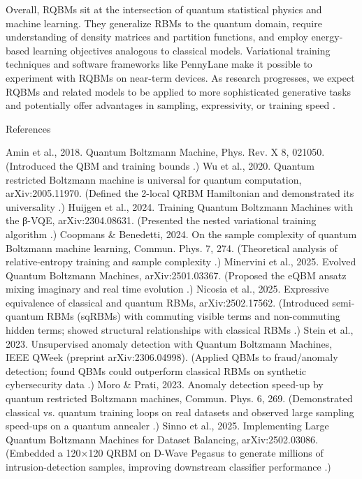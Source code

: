 Overall, RQBMs sit at the intersection of quantum statistical physics and machine learning. They generalize RBMs to the quantum domain, require understanding of density matrices and partition functions, and employ energy-based learning objectives analogous to classical models. Variational training techniques and software frameworks like PennyLane make it possible to experiment with RQBMs on near-term devices. As research progresses, we expect RQBMs and related models to be applied to more sophisticated generative tasks and potentially offer advantages in sampling, expressivity, or training speed .





References





Amin et al., 2018. Quantum Boltzmann Machine, Phys. Rev. X 8, 021050. (Introduced the QBM and training bounds .)
Wu et al., 2020. Quantum restricted Boltzmann machine is universal for quantum computation, arXiv:2005.11970. (Defined the 2-local QRBM Hamiltonian and demonstrated its universality .)
Huijgen et al., 2024. Training Quantum Boltzmann Machines with the β-VQE, arXiv:2304.08631. (Presented the nested variational training algorithm .)
Coopmans & Benedetti, 2024. On the sample complexity of quantum Boltzmann machine learning, Commun. Phys. 7, 274. (Theoretical analysis of relative-entropy training and sample complexity .)
Minervini et al., 2025. Evolved Quantum Boltzmann Machines, arXiv:2501.03367. (Proposed the eQBM ansatz mixing imaginary and real time evolution .)
Nicosia et al., 2025. Expressive equivalence of classical and quantum RBMs, arXiv:2502.17562. (Introduced semi-quantum RBMs (sqRBMs) with commuting visible terms and non-commuting hidden terms; showed structural relationships with classical RBMs .)
Stein et al., 2023. Unsupervised anomaly detection with Quantum Boltzmann Machines, IEEE QWeek (preprint arXiv:2306.04998). (Applied QBMs to fraud/anomaly detection; found QBMs could outperform classical RBMs on synthetic cybersecurity data .)
Moro & Prati, 2023. Anomaly detection speed-up by quantum restricted Boltzmann machines, Commun. Phys. 6, 269. (Demonstrated classical vs. quantum training loops on real datasets and observed large sampling speed-ups on a quantum annealer .)
Sinno et al., 2025. Implementing Large Quantum Boltzmann Machines for Dataset Balancing, arXiv:2502.03086. (Embedded a 120×120 QRBM on D-Wave Pegasus to generate millions of intrusion-detection samples, improving downstream classifier performance .)


~
